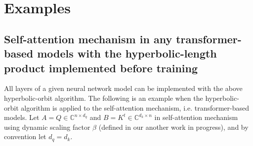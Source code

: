 \documentclass{article}
\theoremstyle{plain}
\theoremstyle{plain} %
\theoremstyle{definition}  %
\theoremstyle{remark}  %
\theoremstyle{plain}
\begin{document}
 
\section{Examples}
\subsection{Self-attention mechanism in any transformer-based models with the hyperbolic-length product implemented before training}
All layers of a given neural network model can be implemented with the above hyperbolic-orbit algorithm. The following is an example when the hyperbolic-orbit algorithm is applied to the self-attention mechanism, i.e. transformer-based models.
Let $A=Q\in \mathbb{C}^{n\times d_q}$ and $B=K^t\in \mathbb{C}^{d_k\times n}$ in self-attention mechanism\cite{vaswani2017attention} using dynamic scaling factor $\beta$ (defined in our another work in progress), and by convention let $d_q=d_k$.





\end{document}
